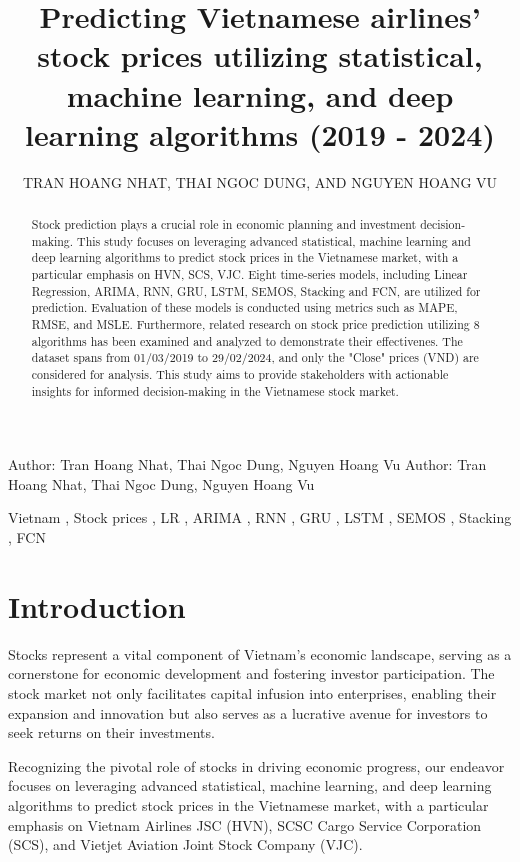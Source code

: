 \documentclass{ieeeojies}
\title{\fontsize{21}{25}\selectfont Predicting Vietnamese airlines' stock prices utilizing statistical, machine learning, and deep learning algorithms (2019 - 2024)}
\author{\uppercase{Tran Hoang Nhat}\authorrefmark{1},
\uppercase{Thai Ngoc Dung\authorrefmark{2}, and Nguyen Hoang Vu}\authorrefmark{3}}
\begin{document}
\markboth
{Author: Tran Hoang Nhat, Thai Ngoc Dung, Nguyen Hoang Vu}
{Author: Tran Hoang Nhat, Thai Ngoc Dung, Nguyen Hoang Vu}

\begin{abstract}

Stock prediction plays a crucial role in economic planning and investment decision-making. This study focuses on leveraging advanced statistical,  machine learning and deep learning algorithms to predict stock prices in the Vietnamese market, with a particular emphasis on HVN, SCS, VJC. Eight time-series models, including Linear Regression, ARIMA,  RNN, GRU, LSTM, SEMOS, Stacking and FCN, are utilized for prediction. Evaluation of these models is conducted using metrics such as MAPE, RMSE, and MSLE. Furthermore, related research on stock price prediction utilizing 8 algorithms has been examined and analyzed to demonstrate their effectivenes. The dataset spans from 01/03/2019 to 29/02/2024, and only the "Close" prices (VND) are considered for analysis. This study aims to provide stakeholders with actionable insights for informed decision-making in the Vietnamese stock market.
\end{abstract}
\begin{keywords}
    Vietnam , Stock prices , LR , ARIMA , RNN , GRU , LSTM , SEMOS , Stacking , FCN
\end{keywords}


\titlepgskip=-30pt

\maketitle

\section{Introduction}
\label{sec:introduction}

Stocks represent a vital component of Vietnam's economic landscape, serving as a cornerstone for economic development and fostering investor participation. The stock market not only facilitates capital infusion into enterprises, enabling their expansion and innovation but also serves as a lucrative avenue for investors to seek returns on their investments.

Recognizing the pivotal role of stocks in driving economic progress, our endeavor focuses on leveraging advanced statistical, machine learning, and deep learning algorithms to predict stock prices in the Vietnamese market, with a particular emphasis on Vietnam Airlines JSC (HVN), SCSC Cargo Service Corporation (SCS), and Vietjet Aviation Joint Stock Company (VJC).
\end{document}
